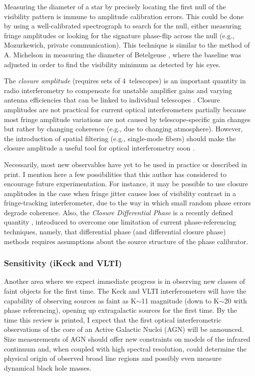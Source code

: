 \documentclass[12pt]{iopart}
\begin{document}
Measuring the diameter of a star by precisely locating the first null
of the visibility pattern is immune to amplitude calibration errors.
This could be done by using a well-calibrated spectrograph to search
for the null, either measuring fringe amplitudes or looking for the
signature phase-flip across the null (e.g., Mozurkewich, private
communication).  This technique is similar to the method of A.
Michelson in measuring the diameter of Betelgeuse
\citep{michelson1921}, where the baseline was adjusted in order to
find the visibility minimum as detected by his eyes.

The {\em closure amplitude} (requires sets of 4~telescopes) is an
important quantity in radio interferometry to compensate for unstable
amplifier gains and varying antenna efficiencies that can be linked to
individual telescopes \citep[e.g.,][]{readhead1980}.  Closure
amplitudes are not practical for current optical interferometers
partially because most fringe amplitude variations are not caused by
telescope-specific gain changes but rather by changing coherence
(e.g., due to changing atmosphere).  However, the introduction of
spatial filtering (e.g., single-mode fibers) should make the closure
amplitude a useful tool for optical interferometry soon \citep[see
discussion in][]{monnier_mss}.  

Necessarily, most new observables have yet to be used in practice or
described in print.  I mention here a few possibilities that this
author has considered to encourage future experimentation.  For
instance, it may be possible to use closure amplitudes in the
case when fringe jitter causes loss of visibility contrast in a
fringe-tracking interferometer, due to the way in which small random
phase errors degrade coherence. Also, the {\em Closure Differential
  Phase} is a recently defined quantity \citep{monnier2002},
introduced to overcome one limitation of current phase-referencing
techniques, namely, that differential phase (and differential closure
phase) methods requires assumptions about the source structure of the
phase calibrator.  

\subsubsection{Sensitivity (iKeck and VLTI)}
Another area where we expect immediate progress is in observing new
classes of faint objects for the first time.  The Keck and VLTI
interferometers will have the capability of observing sources as faint
as K$\sim$11 magnitude (down to K$\sim$20 with phase referencing),
opening up extragalactic sources for the first time.  By the time this
review is printed, I expect that the first optical interferometric
observations of the core of an Active Galactic Nuclei (AGN) will be
announced.  Size measurements of AGN should offer new constraints on
models of the infrared continuum and, when coupled with high spectral
resolution, could determine the physical origin of observed broad line
regions and possibly even measure dynamical black hole masses.
\end{document}
